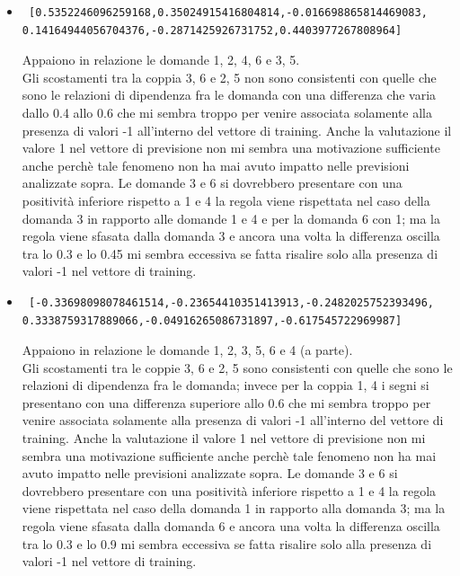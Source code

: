 \begin{itemize}
\item \begin{verbatim} [0.5352246096259168,0.35024915416804814,-0.016698865814469083,
0.14164944056704376,-0.2871425926731752,0.4403977267808964]
\end{verbatim}
Appaiono in relazione le domande 1, 2, 4, 6  e 3, 5.\\
Gli scostamenti tra la coppia 3, 6 e 2, 5 non  sono consistenti con quelle che sono le relazioni di dipendenza fra le domanda con una differenza che varia dallo 0.4 allo 0.6 che mi sembra troppo per venire associata solamente alla presenza di valori -1 all'interno del vettore di training. Anche la valutazione il valore 1 nel vettore di previsione non mi sembra una motivazione sufficiente anche perch\`e tale fenomeno non ha mai avuto impatto nelle previsioni analizzate sopra.
Le domande 3 e 6 si dovrebbero presentare con una positivit\`a inferiore rispetto a 1 e 4 la regola viene rispettata nel caso della domanda 3 in rapporto alle domande 1 e 4 e per la domanda 6 con 1; ma la regola viene sfasata dalla domanda 3 e ancora una volta la differenza oscilla tra lo 0.3 e lo 0.45 mi sembra eccessiva se fatta risalire solo alla presenza di valori -1 nel vettore di training.


\item \begin{verbatim} [-0.33698098078461514,-0.23654410351413913,-0.2482025752393496,
0.3338759317889066,-0.04916265086731897,-0.617545722969987]
\end{verbatim}
Appaiono in relazione le domande 1, 2, 3, 5, 6 e 4 (a parte).\\
Gli scostamenti tra le coppie 3, 6 e 2, 5 sono consistenti con quelle che sono le relazioni di dipendenza fra le domanda; invece per la coppia 1, 4 i segni si presentano con una differenza superiore allo 0.6 che mi sembra troppo per venire associata solamente alla presenza di valori -1 all'interno del vettore di training. Anche la valutazione il valore 1 nel vettore di previsione non mi sembra una motivazione sufficiente anche perch\`e tale fenomeno non ha mai avuto impatto nelle previsioni analizzate sopra.
Le domande 3 e 6 si dovrebbero presentare con una positivit\`a inferiore rispetto a 1 e 4 la regola viene rispettata nel caso della domanda 1 in rapporto alla domanda 3; ma la regola viene sfasata dalla domanda 6 e ancora una volta la differenza oscilla tra lo 0.3 e lo 0.9 mi sembra eccessiva se fatta risalire solo alla presenza di valori -1 nel vettore di training.
\end{itemize}

